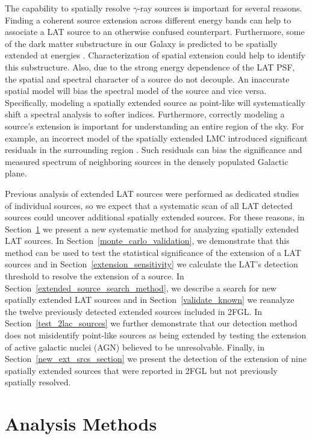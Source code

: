 \documentclass[12pt,preprint]{aastex}
\newcommand{\gev}{\text{GeV}\xspace}
\begin{document}
The capability to spatially resolve \gev $\gamma$-ray
sources is important for several reasons.  
Finding a coherent source extension across different energy bands can
help to associate a LAT source to an otherwise confused counterpart.
Furthermore, some of the dark matter substructure in our Galaxy 
is predicted to be spatially extended at \gev energies \citep{pre_luanch_dark_matter_fermi}.  
Characterization of spatial extension could help to identify this substructure.
Also,
due to the strong energy dependence of the LAT PSF, the spatial and
spectral character of a source do not decouple. An inaccurate
spatial model will bias the spectral model of the source and vice versa. Specifically,
modeling a spatially extended source as point-like will systematically
shift a spectral analysis to softer indices. Furthermore, correctly
modeling a source's extension is important for 
understanding an entire region of the sky. For example,
an incorrect model of the spatially extended LMC introduced
significant residuals in the surrounding region \citep{first_cat,second_cat}.
Such residuals can bias the significance and measured spectrum of
neighboring sources in the densely populated Galactic plane.


Previous analysis of
extended LAT sources were performed as dedicated studies
of individual sources, so we expect
that a systematic scan of all LAT detected sources
could uncover additional spatially extended sources.  For these
reasons, in Section~\ref{analysis_methods_section} we present
a new systematic method for analyzing spatially extended LAT sources. In
Section~\ref{monte_carlo_validation}, we demonstrate that this method
can be used to test the statistical significance of
the extension of
a LAT sources and in Section~\ref{extension_sensitivity} we calculate
the LAT's detection threshold to resolve the extension of a source.
In Section~\ref{extended_source_search_method}, we describe a search for
new spatially extended LAT sources and in Section~\ref{validate_known}
we reanalyze the twelve previously detected extended sources
included in 2FGL.  In Section~\ref{test_2lac_sources} we further
demonstrate that our detection method does not misidentify
point-like sources as being extended 
by testing the extension of active
galactic nuclei (AGN) believed to be unresolvable. Finally, in
Section~\ref{new_ext_srcs_section} we present the detection of the
extension of nine spatially extended sources that were reported in 2FGL
but not previously spatially resolved.


\section{Analysis Methods}
\label{analysis_methods_section}
\end{document}
